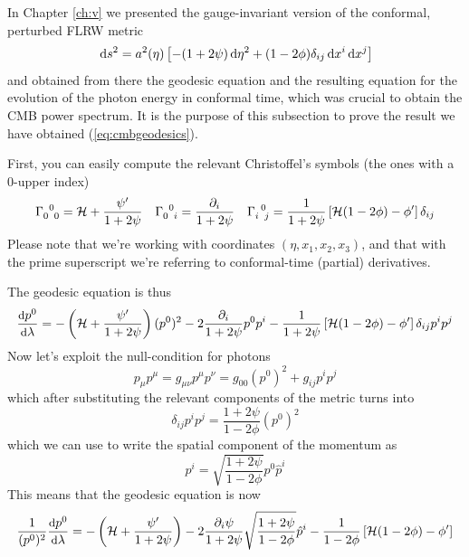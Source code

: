 In Chapter \ref{ch:v} we presented the gauge-invariant version of the conformal, perturbed FLRW metric 
\begin{equation}
    \,\text{d}s^{2} = a^{2}(\eta)\left[-(1+2\psi)\,\text{d}\eta^{2} + (1-2\phi)\delta_{ij}\,\text{d}x^{i}\,\text{d}x^{j}\right]
    \label{eq:gauge-inv-fix-FLRW}
\end{equation}
and obtained from there the geodesic equation and the resulting equation for the evolution of the photon energy in conformal time, which was crucial to obtain the CMB power spectrum. It is the purpose of this subsection to prove the result we have obtained (\ref{eq:cmbgeodesics}).
\par First, you can easily compute the relevant Christoffel's symbols (the ones with a 0-upper index)
\begin{equation}
    \Gamma_{0\;\;0}^{\;\;0} = \mathcal{H} + \frac{\psi'}{1+2\psi} \quad \Gamma_{0\;\;i}^{\;\;0} = \frac{\partial_{i}}{1+2\psi} \quad \Gamma_{i\;\;j}^{\;\;0} = \frac{1}{1+2\psi}\left[\mathcal{H}(1-2\phi)-\phi'\right]\delta_{ij}
\end{equation}
Please note that we're working with coordinates $(\eta, x_{1}, x_{2}, x_{3})$, and that with the prime superscript we're referring to conformal-time (partial) derivatives.
\par The geodesic equation is thus 
\begin{equation}
    \small{
    \frac{\text{d}p^{0}}{\text{d}\lambda} = -\left(\mathcal{H} + \frac{\psi'}{1+2\psi}\right)(p^{0})^{2}-2\frac{\partial_{i}}{1+2\psi}p^{0}p^{i}-\frac{1}{1+2\psi}\left[\mathcal{H}(1-2\phi)-\phi'\right]\delta_{ij}p^{i}p^{j}
    }
\end{equation}
Now let's exploit the null-condition for photons 
\begin{equation}
    p_{\mu}p^{\mu} = g_{\mu\nu}p^{\mu}p^{\nu} = g_{00}(p^{0})^{2}+g_{ij}p^{i}p^{j}
\end{equation}
which after substituting the relevant components of the metric turns into 
\begin{equation}
    \delta_{ij}p^{i}p^{j} = \frac{1+2\psi}{1-2\phi}(p^{0})^{2}
\end{equation}
which we can use to write the spatial component of the momentum as 
\begin{equation}
    p^{i} = \sqrt{\frac{1+2\psi}{1-2\phi}}p^{0}\hat{p}^{i}
\end{equation}
This means that the geodesic equation is now
\begin{equation}
    \small{
    \frac{1}{(p^{0})^{2}}\frac{\text{d}p^{0}}{\text{d}\lambda} = -\left(\mathcal{H} + \frac{\psi'}{1+2\psi}\right)-2\frac{\partial_{i}\psi}{1+2\psi}\sqrt{\frac{1+2\psi}{1-2\phi}}\hat{p}^{i}-\frac{1}{1-2\phi}\left[\mathcal{H}(1-2\phi)-\phi'\right]
    }
\end{equation}
